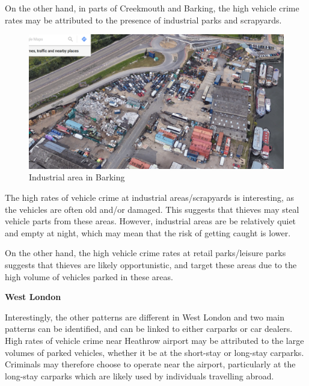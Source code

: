 \documentclass[]{article}
\theoremstyle{definition}
\theoremstyle{definition}
\theoremstyle{definition}
\theoremstyle{remark}
\begin{document}
On the other hand, in parts of Creekmouth and Barking, the high vehicle
crime rates may be attributed to the presence of industrial parks and
scrapyards.

\begin{figure}
\centering
\includegraphics{pictures/Barkingscrapyard.png}
\caption{Industrial area in Barking}
\end{figure}

The high rates of vehicle crime at industrial areas/scrapyards is
interesting, as the vehicles are often old and/or damaged. This suggests
that thieves may steal vehicle parts from these areas. However,
industrial areas are be relatively quiet and empty at night, which may
mean that the risk of getting caught is lower.

On the other hand, the high vehicle crime rates at retail parks/leisure
parks suggests that thieves are likely opportunistic, and target these
areas due to the high volume of vehicles parked in these areas.

\textbf{West London}

Interestingly, the other patterns are different in West London and two
main patterns can be identified, and can be linked to either carparks or
car dealers. High rates of vehicle crime near Heathrow airport may be
attributed to the large volumes of parked vehicles, whether it be at the
short-stay or long-stay carparks. Criminals may therefore choose to
operate near the airport, particularly at the long-stay carparks which
are likely used by individuals travelling abroad.
\end{document}

